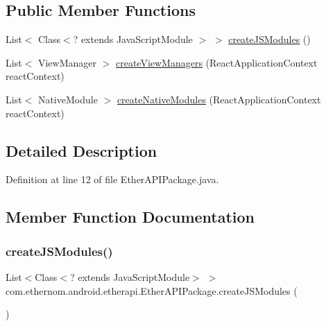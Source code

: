 \subsection*{Public Member Functions}
\begin{DoxyCompactItemize}
\item 
List$<$ Class$<$? extends Java\+Script\+Module $>$ $>$ \mbox{\hyperlink{classcom_1_1ethernom_1_1android_1_1etherapi_1_1_ether_a_p_i_package_aa2eca6b1e370a528c0d9dfda88267351}{create\+J\+S\+Modules}} ()
\item 
List$<$ View\+Manager $>$ \mbox{\hyperlink{classcom_1_1ethernom_1_1android_1_1etherapi_1_1_ether_a_p_i_package_a266f89f83302d68b959bf433a4d23ce5}{create\+View\+Managers}} (React\+Application\+Context react\+Context)
\item 
List$<$ Native\+Module $>$ \mbox{\hyperlink{classcom_1_1ethernom_1_1android_1_1etherapi_1_1_ether_a_p_i_package_afb3f3bc923c08f8b7210e421f956ad5c}{create\+Native\+Modules}} (React\+Application\+Context react\+Context)
\end{DoxyCompactItemize}


\subsection{Detailed Description}


Definition at line 12 of file Ether\+A\+P\+I\+Package.\+java.



\subsection{Member Function Documentation}
\mbox{\label{classcom_1_1ethernom_1_1android_1_1etherapi_1_1_ether_a_p_i_package_aa2eca6b1e370a528c0d9dfda88267351}} 
\subsubsection{\texorpdfstring{create\+J\+S\+Modules()}{createJSModules()}}
{\footnotesize\ttfamily List$<$Class$<$? extends Java\+Script\+Module$>$ $>$ com.\+ethernom.\+android.\+etherapi.\+Ether\+A\+P\+I\+Package.\+create\+J\+S\+Modules (\begin{DoxyParamCaption}{ }\end{DoxyParamCaption})}



